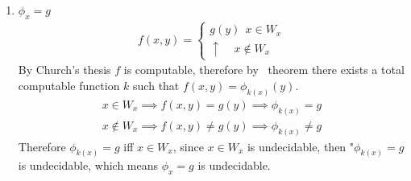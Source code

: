 \begin{enumerate}[label=\arabic*.]
    \item $\phi_x = g$
        \begin{gather*}
            f(x, y) = \begin{cases}
                g(y) \ \ x \in W_x \\
                \uparrow \ \ \ \ \ x \notin W_x
            \end{cases}
        \end{gather*}
        By Church's thesis $f$ is computable, therefore by \smn\ theorem there exists a total computable function $k$ such that $f(x, y) = \phi_{k(x)}(y)$.
        \begin{gather*}
            x \in W_x \implies f(x, y) = g(y) \implies \phi_{k(x)} = g \\
            x \notin W_x \implies f(x, y) \ne g(y) \implies \phi_{k(x)} \ne g
        \end{gather*}
        Therefore $\phi_{k(x)} = g$ iff $x \in W_x$, since $x \in W_x$ is undecidable, then "$\phi_{k(x)} = g$ is undecidable, which means $\phi_x = g$ is undecidable.
\end{enumerate}